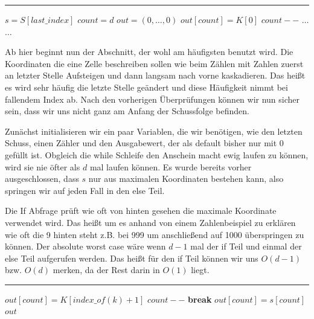 \documentclass[a4paper,12pt]{llncs}
\numberwithin{equation}{section}
\begin{document}
\smallskip
\hrule
\smallskip

\begin{tcolorbox}
	\begin{algorithmic}
		\State $s=S[last\_index]$
		\State $count =d$
		\State $out=(0,\dots,0)$
		\State $out[count]=K[0]$
		\State $count--$
		\Else
		\State $\dots$
		\EndIf
		\State $\dots$
		\EndWhile
	\end{algorithmic}
\end{tcolorbox}

Ab hier beginnt nun der Abschnitt, der wohl am häufigsten benutzt wird. Die Koordinaten die eine Zelle beschreiben sollen wie beim Zählen mit Zahlen zuerst an letzter Stelle Aufsteigen und dann langsam nach vorne kaskadieren. Das heißt es wird sehr häufig die letzte Stelle geändert und diese Häufigkeit nimmt bei fallendem Index ab. Nach den vorherigen Überprüfungen können wir nun sicher sein, dass wir uns nicht ganz am Anfang der Schussfolge befinden.

Zunächst initialisieren wir ein paar Variablen, die wir benötigen, wie den letzten Schuss, einen Zähler und den Ausgabewert, der als default bisher nur mit 0 gefüllt ist. Obgleich die while Schleife den Anschein macht ewig laufen zu können, wird sie nie öfter als $d$ mal laufen können. Es wurde bereits vorher ausgeschlossen, dass $s$ nur aus maximalen Koordinaten bestehen kann, also springen wir auf jeden Fall in den else Teil. 

Die If Abfrage prüft wie oft von hinten gesehen die maximale Koordinate verwendet wird. Das heißt um es anhand von einem Zahlenbeispiel zu erklären wie oft die 9 hinten steht z.B. bei 999 um anschließend auf 1000 überspringen zu können. Der absolute worst case wäre wenn $d-1$ mal der if Teil und einmal der else Teil aufgerufen werden. Das heißt für den if Teil können wir uns $O(d-1)$ bzw. $O(d)$ merken, da der Rest darin in $O(1)$ liegt.



\smallskip
\hrule
\smallskip

\begin{tcolorbox}
	\begin{algorithmic}
		\For{\textbf{each } $k\in K\backslash\{max\_coord\}$}
		\If{$s[count]=k$}
		\State $out[count]=K[index\_of(k)+1]$
		\State $count--$
		\State \textbf{break}
		\EndIf
		\EndFor
		\For{int $j=count$ \textbf{ to } 1}
		\State $out[count]=s[count]$
		\EndFor
		\State\Return $out$
	\end{algorithmic}
\end{tcolorbox}
\end{document}
